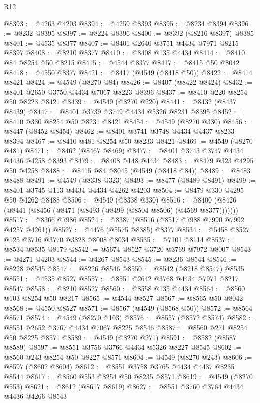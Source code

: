 \begin{lexlean}{R12}
\begin{coremodule}
@8393 := @4263 @4203
@8394 := @4259 @8393
@8395 := @8234 @8394
@8396 := @8232 @8395
@8397 := @8224 @8396
@8400 := @8392 (@8216 @8397) @8385
@8401 := @4535 @8377
@8407 := @8401 @2640 @3751 @4434 @7971 @8215 @8397
@8408 := @8210 @8377
@8410 := @8408 @135 @4434
@8414 := @8410 @84 @8254 @50 @8215
@8415 := @4544 @8377
@8417 := @8415 @50 @8042
@8418 := @4550 @8377
@8421 := @8417 (@4549 (@8418 @50))
@8422 := @8414 @8421
@8424 := @4549 (@8270 @84)
@8426 := @8407 (@8422 @8424)
@8432 := @8401 @2650 @3750 @4434 @7067 @8223 @8396
@8437 := @8410 @220 @8254 @50 @8223 @8421
@8439 := @4549 (@8270 @220)
@8441 := @8432 (@8437 @8439)
@8447 := @8401 @3739 @3749 @4434 @5326 @8231 @8395
@8452 := @8410 @330 @8254 @50 @8231 @8421
@8454 := @4549 (@8270 @330)
@8456 := @8447 (@8452 @8454)
@8462 := @8401 @3741 @3748 @4434 @4437 @8233 @8394
@8467 := @8410 @481 @8254 @50 @8233 @8421
@8469 := @4549 (@8270 @481)
@8471 := @8462 (@8467 @8469)
@8477 := @8401 @3743 @3747 @4434 @4436 @4258 @8393
@8479 := @8408 @148 @4434
@8483 := @8479 @323 @4295 @50 @4258
@8488 := @8415 @84 @8045 (@4549 (@8418 @84))
@8489 := @8483 @8488
@8491 := @4549 (@8338 @323)
@8493 := @8477 (@8489 @8491)
@8499 := @8401 @3745 @113 @4434 @4434 @4262 @4203
@8504 := @8479 @330 @4295 @50 @4262 @8488
@8506 := @4549 (@8338 @330)
@8516 := @8400 (@8426 (@8441 (@8456 (@8471 (@8493 (@8499 (@8504 @8506) (@4569 @8377)))))))
@8517 := @8366 @7986
@8524 := @8387 (@8516 (@8517 @7988 @7990 @7992 @4257 @4261))
@8527 := @4476 (@5575 @8385) @8377
@8534 := @5458 @8527 @125 @3716 @3770 @3828 @8008 @8034
@8535 := @7101 @8114
@8537 := @8534 @8535 @8179
@8542 := @5674 @8527 @3720 @3769 @7972 @8007
@8543 := @4271 @4203
@8544 := @4267 @8543
@8545 := @8236 @8544
@8546 := @8228 @8545
@8547 := @8226 @8546
@8550 := @8542 (@8218 @8547) @8535
@8551 := @4535 @8527
@8557 := @8551 @2642 @3768 @4434 @7971 @8217 @8547
@8558 := @8210 @8527
@8560 := @8558 @135 @4434
@8564 := @8560 @103 @8254 @50 @8217
@8565 := @4544 @8527
@8567 := @8565 @50 @8042
@8568 := @4550 @8527
@8571 := @8567 (@4549 (@8568 @50))
@8572 := @8564 @8571
@8574 := @4549 (@8270 @103)
@8576 := @8557 (@8572 @8574)
@8582 := @8551 @2652 @3767 @4434 @7067 @8225 @8546
@8587 := @8560 @271 @8254 @50 @8225 @8571
@8589 := @4549 (@8270 @271)
@8591 := @8582 (@8587 @8589)
@8597 := @8551 @3756 @3766 @4434 @5326 @8227 @8545
@8602 := @8560 @243 @8254 @50 @8227 @8571
@8604 := @4549 (@8270 @243)
@8606 := @8597 (@8602 @8604)
@8612 := @8551 @3758 @3765 @4434 @4437 @8235 @8544
@8617 := @8560 @553 @8254 @50 @8235 @8571
@8619 := @4549 (@8270 @553)
@8621 := @8612 (@8617 @8619)
@8627 := @8551 @3760 @3764 @4434 @4436 @4266 @8543

\end{coremodule}
\end{lexlean}
